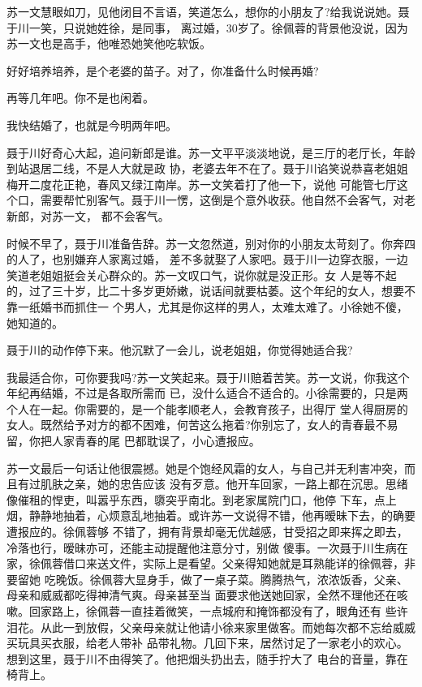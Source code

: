 \documentclass[11pt,a4paper,onecolumn]{article}
\begin{document}
苏一文慧眼如刀，见他闭目不言语，笑道怎么，想你的小朋友了?给我说说她。聂于川一笑，只说她姓徐，是同事，
离过婚，30岁了。徐佩蓉的背景他没说，因为苏一文也是高手，他唯恐她笑他吃软饭。

好好培养培养，是个老婆的苗子。对了，你准备什么时候再婚?

再等几年吧。你不是也闲着。

我快结婚了，也就是今明两年吧。

聂于川好奇心大起，追问新郎是谁。苏一文平平淡淡地说，是三厅的老厅长，年龄到站退居二线，不是人大就是政
协，老婆去年不在了。聂于川谄笑说恭喜老姐姐梅开二度花正艳，春风又绿江南岸。苏一文笑着打了他一下，说他
可能管七厅这个口，需要帮忙别客气。聂于川一愣，这倒是个意外收获。他自然不会客气，对老新郎，对苏一文，
都不会客气。

时候不早了，聂于川准备告辞。苏一文忽然道，别对你的小朋友太苛刻了。你奔四的人了，也别嫌弃人家离过婚，
差不多就娶了人家吧。聂于川一边穿衣服，一边笑道老姐姐挺会关心群众的。苏一文叹口气，说你就是没正形。女
人是等不起的，过了三十岁，比二十多岁更娇嫩，说话间就要枯萎。这个年纪的女人，想要不靠一纸婚书而抓住一
个男人，尤其是你这样的男人，太难太难了。小徐她不傻，她知道的。

聂于川的动作停下来。他沉默了一会儿，说老姐姐，你觉得她适合我?

我最适合你，可你要我吗?苏一文笑起来。聂于川赔着苦笑。苏一文说，你我这个年纪再结婚，不过是各取所需而
已，没什么适合不适合的。小徐需要的，只是两个人在一起。你需要的，是一个能孝顺老人，会教育孩子，出得厅
堂人得厨房的女人。既然给予对方的都不困难，何苦这么拖着?你别忘了，女人的青春最不易留，你把人家青春的尾
巴都耽误了，小心遭报应。

苏一文最后一句话让他很震撼。她是个饱经风霜的女人，与自己并无利害冲突，而且有过肌肤之亲，她的忠告应该
没有歹意。他开车回家，一路上都在沉思。思绪像催租的悍吏，叫嚣乎东西，隳突乎南北。到老家属院门口，他停
下车，点上烟，静静地抽着，心烦意乱地抽着。或许苏一文说得不错，他再暧昧下去，的确要遭报应的。徐佩蓉够
不错了，拥有背景却毫无优越感，甘受招之即来挥之即去，冷落也行，暧昧亦可，还能主动提醒他注意分寸，别做
傻事。一次聂于川生病在家，徐佩蓉借口来送文件，实际上是看望。父亲得知她就是耳熟能详的徐佩蓉，非要留她
吃晚饭。徐佩蓉大显身手，做了一桌子菜。腾腾热气，浓浓饭香，父亲、母亲和威威都吃得神清气爽。母亲甚至当
面要求他送她回家，全然不理他还在咳嗽。回家路上，徐佩蓉一直挂着微笑，一点城府和掩饰都没有了，眼角还有
些许泪花。从此一到放假，父亲母亲就让他请小徐来家里做客。而她每次都不忘给威威买玩具买衣服，给老人带补
品带礼物。几回下来，居然讨足了一家老小的欢心。想到这里，聂于川不由得笑了。他把烟头扔出去，随手拧大了
电台的音量，靠在椅背上。
\end{document}
